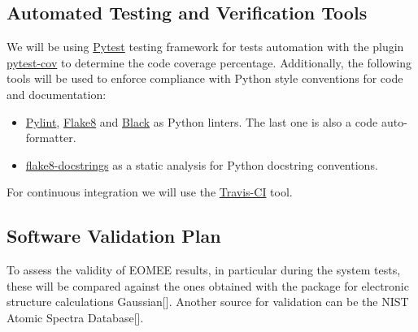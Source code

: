 \documentclass[12pt, titlepage]{article}
\begin{document}

\subsection{Automated Testing and Verification Tools}

We will be using \href{https://docs.pytest.org/en/stable/} 
{Pytest} testing framework for tests automation  with the plugin 
\href{https://pytest-cov.readthedocs.io/en/latest/} {pytest-cov} to 
determine the code coverage percentage. Additionally, the following tools 
will be 
used to enforce compliance with Python style 
conventions for code and documentation:
\begin{itemize}
\item \href{https://www.pylint.org/} {Pylint}, 
\href{https://flake8.pycqa.org/en/latest/} {Flake8} and 
\href{https://black.readthedocs.io/en/stable/#} {Black} as Python linters. The 
last one is also a code auto-formatter. 
\item \href{https://pypi.org/project/flake8-docstrings/} {flake8-docstrings} as 
a static analysis for Python docstring conventions.
\end{itemize}
For continuous integration we will use the \href{https://travis-ci.org/} 
{Travis-CI} tool.

\subsection{Software Validation Plan}

To assess the validity of EOMEE results, in particular during the system tests, 
these will be compared against the ones obtained with the package for 
electronic structure calculations Gaussian[\cite{g16}]. Another source for 
validation can be the NIST Atomic Spectra 
Database[\cite{NIST_ASD}].
\end{document}
